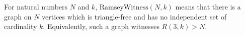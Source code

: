 \begin{definition}
For natural numbers \(N\) and \(k\), \(\mathrm{RamseyWitness}(N,k)\) means that
there is a graph on \(N\) vertices which is triangle-free and has no independent
set of cardinality \(k\). Equivalently, such a graph witnesses \(R(3,k)>N\).
\end{definition}
